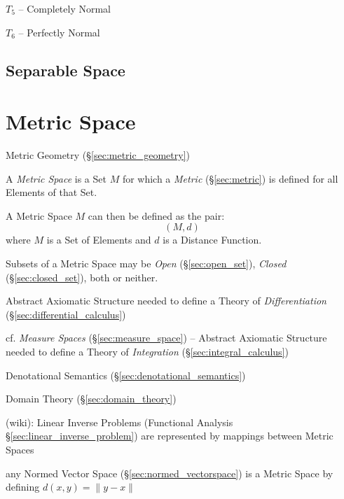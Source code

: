 $\xspace{T}_5$ -- Completely Normal

$\xspace{T}_6$ -- Perfectly Normal



\subsection{Separable Space}\label{sec:separable_space}



\section{Metric Space}\label{sec:metric_space}

\fist Metric Geometry (\S\ref{sec:metric_geometry})

A \emph{Metric Space} is a Set $M$ for which a \emph{Metric}
(\S\ref{sec:metric}) is defined for all Elements of that Set.

A Metric Space $M$ can then be defined as the pair:
\[
  (M,d)
\]
where $M$ is a Set of Elements and $d$ is a Distance Function.

Subsets of a Metric Space may be \emph{Open} (\S\ref{sec:open_set}),
\emph{Closed} (\S\ref{sec:closed_set}), both or neither.

Abstract Axiomatic Structure needed to define a Theory of \emph{Differentiation}
(\S\ref{sec:differential_calculus})

cf. \emph{Measure Spaces} (\S\ref{sec:measure_space}) -- Abstract Axiomatic
Structure needed to define a Theory of \emph{Integration}
(\S\ref{sec:integral_calculus})

Denotational Semantics (\S\ref{sec:denotational_semantics})

Domain Theory (\S\ref{sec:domain_theory})

(wiki): Linear Inverse Problems (Functional Analysis
\S\ref{sec:linear_inverse_problem}) are represented by mappings between Metric
Spaces

any Normed Vector Space (\S\ref{sec:normed_vectorspace}) is a Metric Space by
defining $d(x,y) = \|y-x\|$



